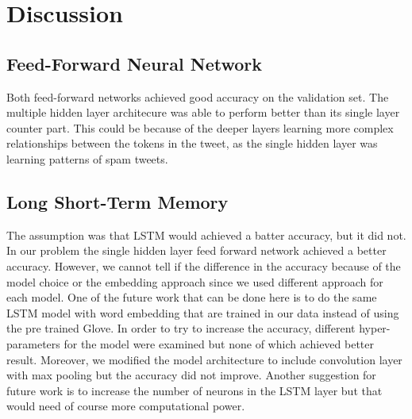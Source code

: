 \section{Discussion}
\label{sec:discussion}

\subsection{Feed-Forward Neural Network} Both feed-forward networks
achieved good accuracy on the validation set. The multiple hidden
layer architecure was able to perform better than its single layer
counter part. This could be because of the deeper layers learning more
complex relationships between the tokens in the tweet, as the single
hidden layer was learning patterns of spam tweets.

\subsection{Long Short-Term Memory }
The assumption was that LSTM would achieved a batter accuracy, but it did not. In our problem the single hidden layer feed forward network achieved a better accuracy. However, we cannot tell if the difference in the accuracy because of the model choice or the embedding approach since we used different approach for each model. One of the future work that can be done here is to do the same LSTM model with word embedding that are trained in our data instead of using the pre trained Glove. 
In order to try to increase the accuracy, different hyper-parameters for the model were examined but none of which achieved better result. Moreover, we modified the model architecture to include convolution layer with max pooling but the accuracy did not improve. Another suggestion for future work is to increase the number of neurons in the LSTM layer but that would need of course more computational power. 
